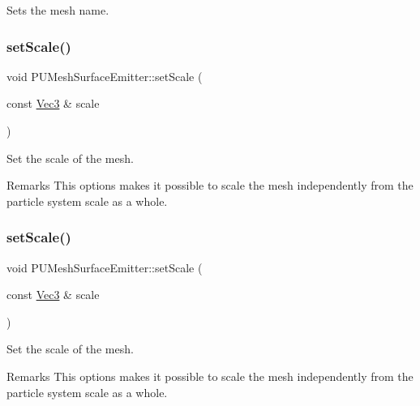 Sets the mesh name. \mbox{\label{classPUMeshSurfaceEmitter_a029bba66d885414ad457f79c1d82f88b}} 
\subsubsection{\texorpdfstring{set\+Scale()}{setScale()}\hspace{0.1cm}{\footnotesize\ttfamily [1/2]}}
{\footnotesize\ttfamily void P\+U\+Mesh\+Surface\+Emitter\+::set\+Scale (\begin{DoxyParamCaption}\item[{const \hyperlink{classVec3}{Vec3} \&}]{scale }\end{DoxyParamCaption})}

Set the scale of the mesh. \begin{DoxyRemark}{Remarks}
This options makes it possible to scale the mesh independently from the particle system scale as a whole. 
\end{DoxyRemark}
\mbox{\label{classPUMeshSurfaceEmitter_a029bba66d885414ad457f79c1d82f88b}} 
\subsubsection{\texorpdfstring{set\+Scale()}{setScale()}\hspace{0.1cm}{\footnotesize\ttfamily [2/2]}}
{\footnotesize\ttfamily void P\+U\+Mesh\+Surface\+Emitter\+::set\+Scale (\begin{DoxyParamCaption}\item[{const \hyperlink{classVec3}{Vec3} \&}]{scale }\end{DoxyParamCaption})}

Set the scale of the mesh. \begin{DoxyRemark}{Remarks}
This options makes it possible to scale the mesh independently from the particle system scale as a whole. 
\end{DoxyRemark}
\mbox{\label{classPUMeshSurfaceEmitter_a688415b477c759993754d5b25957fc78}} 
